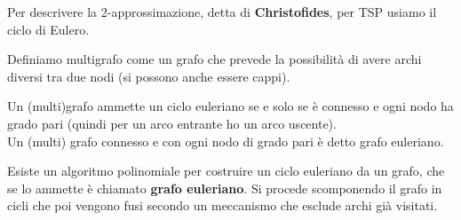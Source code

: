 Per descrivere la 2-approssimazione, detta di \textbf{Christofides}, per TSP
usiamo il ciclo di Eulero.
\begin{definizione}
  Definiamo multigrafo come un grafo che prevede la possibilità di avere archi
  diversi tra due nodi (si possono anche essere cappi).
\end{definizione}
\begin{teorema}
  Un (multi)grafo ammette un ciclo euleriano se e solo se è connesso e ogni nodo
  ha grado pari (quindi per un arco entrante ho un arco uscente).\\
  Un (multi) grafo connesso e con ogni nodo di grado pari è detto grafo
  euleriano. 
\end{teorema}
Esiste un algoritmo polinomiale per costruire un ciclo euleriano da un grafo,
che se lo ammette è chiamato \textbf{grafo euleriano}. Si procede scomponendo il
grafo in cicli che poi vengono fusi secondo un meccanismo che esclude archi già
visitati.\\

